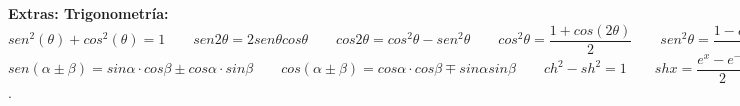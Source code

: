 \documentclass[a4paper, landscape, 12pt]{article}
\begin{document}
\textbf{Extras: Trigonometría:} $sen^{2}(\theta) + cos^{2}(\theta) = 1\qquad 
sen2\theta = 2sen\theta cos\theta\qquad cos2\theta = cos^{2}\theta - 
sen^{2}\theta\qquad cos^{2}\theta = \dfrac{1 + cos(2\theta)}{2} \qquad 
sen^{2}\theta = \dfrac{1 - cos(2\theta)}{2}$ \\ $sen(\alpha \pm \beta) =
sin\alpha \cdot cos\beta \pm cos\alpha \cdot sin\beta \qquad cos(\alpha \pm \beta) = cos\alpha \cdot cos\beta \mp sin\alpha sin\beta\qquad ch^{2} - sh^{2} = 1\qquad shx = \dfrac{e^x - e^{-x}}{2}\qquad chx = \dfrac{e^x + e^{-x}}{2}$. 


 
\end{document}
